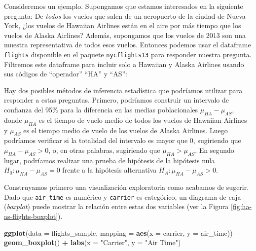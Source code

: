 \documentclass[
]{book}
\newenvironment{Shaded}{\begin{snugshade}}{\end{snugshade}}
\newcommand{\DataTypeTok}[1]{\textcolor[rgb]{0.13,0.29,0.53}{#1}}
\newcommand{\KeywordTok}[1]{\textcolor[rgb]{0.13,0.29,0.53}{\textbf{#1}}}
\newcommand{\NormalTok}[1]{#1}
\newcommand{\OperatorTok}[1]{\textcolor[rgb]{0.81,0.36,0.00}{\textbf{#1}}}
\newcommand{\StringTok}[1]{\textcolor[rgb]{0.31,0.60,0.02}{#1}}
\begin{document}
Consideremos un ejemplo. Supongamos que estamos interesados en la siguiente pregunta: De \emph{todos} los vuelos que salen de un aeropuerto de la ciudad de Nueva York, ¿los vuelos de Hawaiian Airlines están en el aire por más tiempo que los vuelos de Alaska Airlines? Además, supongamos que los vuelos de 2013 son una muestra representativa de todos esos vuelos. Entonces podemos usar el dataframe \texttt{flights} disponible en el paquete \texttt{nycflights13} para responder nuestra pregunta. Filtremos este dataframe para incluir solo a Hawaiian y Alaska Airlines usando sus códigos de ``operador'' ``HA'' y ``AS'':

\begin{Shaded}
\end{Shaded}

Hay dos posibles métodos de inferencia estadística que podríamos utilizar para responder a estas preguntas. Primero, podríamos construir un intervalo de confianza del 95\% para la diferencia en las medias poblacionales \(\mu_{HA}-\mu_{AS}\), donde \(\mu_{HA}\) es el tiempo de vuelo medio de todos los vuelos de Hawaiian Airlines y \(\mu_{AS}\) es el tiempo medio de vuelo de los vuelos de Alaska Airlines. Luego podríamos verificar si la totalidad del intervalo es mayor que 0, sugiriendo que \(\mu_{HA} - \mu_{AS}> 0\), o, en otras palabras, sugiriendo que \(\mu_{HA}> \mu_{AS}\). En segundo lugar, podríamos realizar una prueba de hipótesis de la hipótesis nula \(H_0:\mu_{HA} - \mu_{AS} = 0\) frente a la hipótesis alternativa \(H_A:\mu_{HA}-\mu_{AS}>0\).

Construyamos primero una visualización exploratoria como acabamos de sugerir. Dado que \texttt{air\_time} es numérico y \texttt{carrier} es categórico, un diagrama de caja (\emph{boxplot}) puede mostrar la relación entre estas dos variables (ver la Figura \ref{fig:ha-as-flights-boxplot}).

\begin{Shaded}
\begin{Highlighting}[]
\KeywordTok{ggplot}\NormalTok{(}\DataTypeTok{data =}\NormalTok{ flights_sample, }\DataTypeTok{mapping =} \KeywordTok{aes}\NormalTok{(}\DataTypeTok{x =}\NormalTok{ carrier, }\DataTypeTok{y =}\NormalTok{ air_time)) }\OperatorTok{+}
\StringTok{  }\KeywordTok{geom_boxplot}\NormalTok{() }\OperatorTok{+}
\StringTok{  }\KeywordTok{labs}\NormalTok{(}\DataTypeTok{x =} \StringTok{"Carrier"}\NormalTok{, }\DataTypeTok{y =} \StringTok{"Air Time"}\NormalTok{)}
\end{Highlighting}
\end{Shaded}
\end{document}
